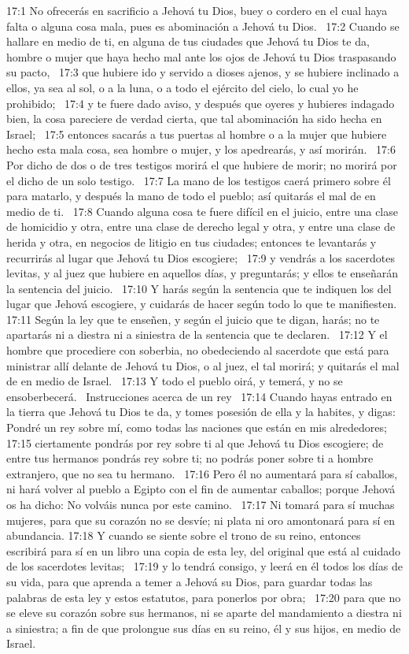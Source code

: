 17:1 No ofrecerás en sacrificio a Jehová tu Dios, buey o cordero en el cual haya falta o alguna cosa mala, pues es abominación a Jehová tu Dios.  
17:2 Cuando se hallare en medio de ti, en alguna de tus ciudades que Jehová tu Dios te da, hombre o mujer que haya hecho mal ante los ojos de Jehová tu Dios traspasando su pacto,  
17:3 que hubiere ido y servido a dioses ajenos, y se hubiere inclinado a ellos, ya sea al sol, o a la luna, o a todo el ejército del cielo, lo cual yo he prohibido;  
17:4 y te fuere dado aviso, y después que oyeres y hubieres indagado bien, la cosa pareciere de verdad cierta, que tal abominación ha sido hecha en Israel;  
17:5 entonces sacarás a tus puertas al hombre o a la mujer que hubiere hecho esta mala cosa, sea hombre o mujer, y los apedrearás, y así morirán.  
17:6 Por dicho de dos o de tres testigos morirá el que hubiere de morir; no morirá por el dicho de un solo testigo.  
17:7 La mano de los testigos caerá primero sobre él para matarlo, y después la mano de todo el pueblo; así quitarás el mal de en medio de ti.  
17:8 Cuando alguna cosa te fuere difícil en el juicio, entre una clase de homicidio y otra, entre una clase de derecho legal y otra, y entre una clase de herida y otra, en negocios de litigio en tus ciudades; entonces te levantarás y recurrirás al lugar que Jehová tu Dios escogiere;  
17:9 y vendrás a los sacerdotes levitas, y al juez que hubiere en aquellos días, y preguntarás; y ellos te enseñarán la sentencia del juicio.  
17:10 Y harás según la sentencia que te indiquen los del lugar que Jehová escogiere, y cuidarás de hacer según todo lo que te manifiesten.  
17:11 Según la ley que te enseñen, y según el juicio que te digan, harás; no te apartarás ni a diestra ni a siniestra de la sentencia que te declaren.  
17:12 Y el hombre que procediere con soberbia, no obedeciendo al sacerdote que está para ministrar allí delante de Jehová tu Dios, o al juez, el tal morirá; y quitarás el mal de en medio de Israel.  
17:13 Y todo el pueblo oirá, y temerá, y no se ensoberbecerá.  
Instrucciones acerca de un rey  
17:14 Cuando hayas entrado en la tierra que Jehová tu Dios te da, y tomes posesión de ella y la habites, y digas: Pondré un rey sobre mí, como todas las naciones que están en mis alrededores;  
17:15 ciertamente pondrás por rey sobre ti al que Jehová tu Dios escogiere; de entre tus hermanos pondrás rey sobre ti; no podrás poner sobre ti a hombre extranjero, que no sea tu hermano.  
17:16 Pero él no aumentará para sí caballos, ni hará volver al pueblo a Egipto con el fin de aumentar caballos; porque Jehová os ha dicho: No volváis nunca por este camino.  
17:17 Ni tomará para sí muchas mujeres, para que su corazón no se desvíe; ni plata ni oro amontonará para sí en abundancia. 
17:18 Y cuando se siente sobre el trono de su reino, entonces escribirá para sí en un libro una copia de esta ley, del original que está al cuidado de los sacerdotes levitas;  
17:19 y lo tendrá consigo, y leerá en él todos los días de su vida, para que aprenda a temer a Jehová su Dios, para guardar todas las palabras de esta ley y estos estatutos, para ponerlos por obra;  
17:20 para que no se eleve su corazón sobre sus hermanos, ni se aparte del mandamiento a diestra ni a siniestra; a fin de que prolongue sus días en su reino, él y sus hijos, en medio de Israel. 

